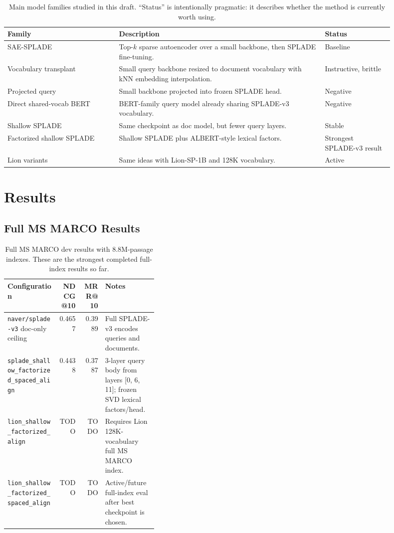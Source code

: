 \documentclass[
]{ceurart}
\begin{document}
\begin{table}[t]
\caption{Main model families studied in this draft. ``Status'' is intentionally
pragmatic: it describes whether the method is currently worth using.}
\label{tab:model-families}
\centering
\begin{tabular}{p{0.26\linewidth}p{0.48\linewidth}p{0.16\linewidth}}
\toprule
Family & Description & Status \\
\midrule
SAE-SPLADE & Top-$k$ sparse autoencoder over a small backbone, then SPLADE
fine-tuning. & Baseline \\
Vocabulary transplant & Small query backbone resized to document vocabulary
with kNN embedding interpolation. & Instructive, brittle \\
Projected query & Small backbone projected into frozen SPLADE head. & Negative \\
Direct shared-vocab BERT & BERT-family query model already sharing
SPLADE-v3 vocabulary. & Negative \\
Shallow SPLADE & Same checkpoint as doc model, but fewer query layers. & Stable \\
Factorized shallow SPLADE & Shallow SPLADE plus ALBERT-style lexical factors. & Strongest SPLADE-v3 result \\
Lion variants & Same ideas with Lion-SP-1B and 128K vocabulary. & Active \\
\bottomrule
\end{tabular}
\end{table}

\section{Results}

\subsection{Full MS MARCO Results}

\begin{table}[t]
\caption{Full MS MARCO dev results with 8.8M-passage indexes. These are the
strongest completed full-index results so far.}
\label{tab:full-msmarco}
\centering
\begin{tabular}{lrrp{0.35\linewidth}}
\toprule
Configuration & NDCG@10 & MRR@10 & Notes \\
\midrule
\texttt{naver/splade-v3} doc-only ceiling
  & 0.4657 & 0.3989 & Full SPLADE-v3 encodes queries and documents. \\
\texttt{splade\_shallow\_factorized\_spaced\_align}
  & 0.4438 & 0.3787 & 3-layer query body from layers [0, 6, 11]; frozen SVD lexical factors/head. \\
\texttt{lion\_shallow\_factorized\_align}
  & TODO & TODO & Requires Lion 128K-vocabulary full MS MARCO index. \\
\texttt{lion\_shallow\_factorized\_spaced\_align}
  & TODO & TODO & Active/future full-index eval after best checkpoint is chosen. \\
\bottomrule
\end{tabular}
\end{table}
\end{document}
